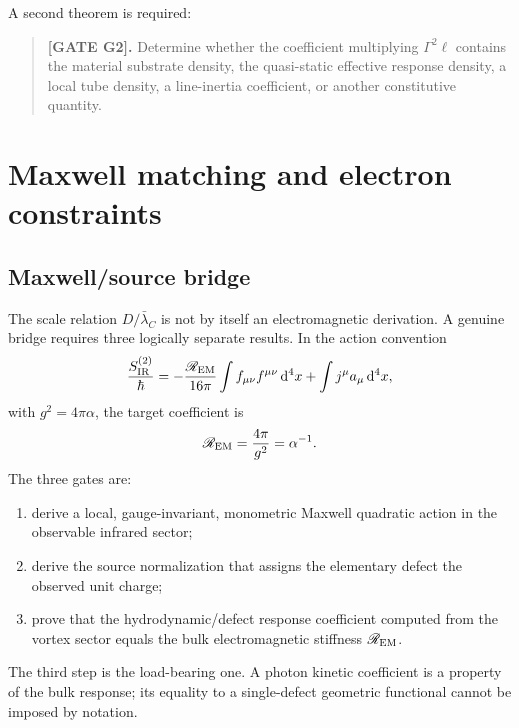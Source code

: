\documentclass[aps,pre,preprint,notitlepage,nofootinbib,superscriptaddress]{revtex4-2}
\newcommand{\dd}{\mathrm d}
\newcommand{\lC}{\bar\lambda_C}
\begin{document}
A second theorem is required:

\begin{quote}
\textbf{[GATE G2].}
Determine whether the coefficient multiplying \(\Gamma^2\ell\) contains the material substrate density, the quasi-static effective response density, a local tube density, a line-inertia coefficient, or another constitutive quantity.
\end{quote}

\section{Maxwell matching and electron constraints}
\label{sec:constraints}

\subsection{Maxwell/source bridge}

The scale relation \(D/\lC\) is not by itself an electromagnetic derivation.  A genuine bridge requires three logically separate results.  In the action convention
\begin{equation}
  \frac{S_{\rm IR}^{(2)}}{\hbar}
  =
  -\frac{\mathscr R_{\rm EM}}{16\pi}
  \int f_{\mu\nu}f^{\mu\nu}\,\dd^4x
  +
  \int j^\mu a_\mu\,\dd^4x,
  \label{eq:IR-action}
\end{equation}
with \(g^2=4\pi\alpha\), the target coefficient is
\begin{equation}
  \mathscr R_{\rm EM}
  =
  \frac{4\pi}{g^2}
  =
  \alpha^{-1}.
  \label{eq:EM-stiffness}
\end{equation}
The three gates are:

\begin{enumerate}[label=\textbf{B2\alph*:},leftmargin=*]
  \item derive a local, gauge-invariant, monometric Maxwell quadratic action in the observable infrared sector;
  \item derive the source normalization that assigns the elementary defect the observed unit charge;
  \item prove that the hydrodynamic/defect response coefficient computed from the vortex sector equals the bulk electromagnetic stiffness \(\mathscr R_{\rm EM}\).
\end{enumerate}

The third step is the load-bearing one.  A photon kinetic coefficient is a property of the bulk response; its equality to a single-defect geometric functional cannot be imposed by notation.
\end{document}
